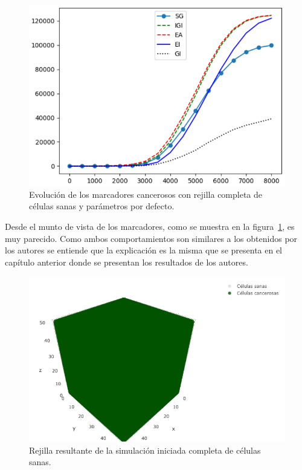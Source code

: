 \begin{figure}[h]
\centering
\includegraphics[scale=0.8]{figures/experiments/exp5/mutations}
\caption{Evolución de los marcadores cancerosos con rejilla completa de células sanas y parámetros por defecto.}
\label{fig:ownexp5-2}
\end{figure}

Desde el munto de vista de los marcadores, como se muestra en la figura~\ref{fig:ownexp5-2}, es muy
parecido. Como ambos comportamientos son similares a los obtenidos por los autores se entiende
que la explicación es la misma que se presenta en el capítulo anterior donde
se presentan los resultados de los autores.

\begin{figure}[h]
\centering
\includegraphics[scale=0.6]{figures/experiments/exp5/grid}
\caption{Rejilla resultante de la simulación iniciada completa de células sanas.}
\label{fig:ownexp5-3}
\end{figure}

